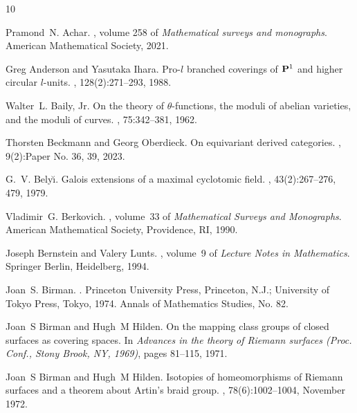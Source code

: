 \documentclass[10pt]{amsart}
\theoremstyle{definition}
\begin{document}
 \def\cprime{$'$}
\begin{thebibliography}{10}

Pramond~N. Achar.
,
  volume 258 of {\em Mathematical surveys and monographs}.
\newblock American Mathematical Society, 2021.

Greg Anderson and Yasutaka Ihara.
\newblock Pro-{$l$} branched coverings of {${\bf P}^1$} and higher circular
  {$l$}-units.
, 128(2):271--293, 1988.

Walter~L. Baily, Jr.
\newblock On the theory of {$\theta $}-functions, the moduli of abelian
  varieties, and the moduli of curves.
, 75:342--381, 1962.

Thorsten Beckmann and Georg Oberdieck.
\newblock On equivariant derived categories.
, 9(2):Paper No. 36, 39, 2023.

G.~V. Bely{\u\i}.
\newblock Galois extensions of a maximal cyclotomic field.
, 43(2):267--276, 479, 1979.

Vladimir~G. Berkovich.
, volume~33 of {\em Mathematical Surveys and Monographs}.
\newblock American Mathematical Society, Providence, RI, 1990.

Joseph Bernstein and Valery Lunts.
, volume~9 of {\em Lecture
  Notes in Mathematics}.
\newblock Springer Berlin, Heidelberg, 1994.

Joan~S. Birman.
.
\newblock Princeton University Press, Princeton, N.J.; University of Tokyo
  Press, Tokyo, 1974.
\newblock Annals of Mathematics Studies, No. 82.

Joan~S Birman and Hugh~M Hilden.
\newblock On the mapping class groups of closed surfaces as covering spaces.
\newblock In {\em Advances in the theory of Riemann surfaces (Proc. Conf.,
  Stony Brook, {NY}, 1969)}, pages 81--115, 1971.

Joan~S Birman and Hugh~M Hilden.
\newblock Isotopies of homeomorphisms of {R}iemann surfaces and a theorem about
  {A}rtin's braid group.
, 78(6):1002--1004, November 1972.


\end{thebibliography}
\end{document}
